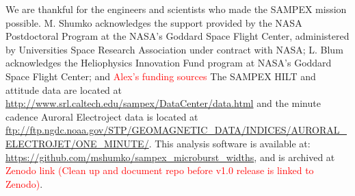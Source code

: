\documentclass[draft]{agujournal2019}
\begin{document}
%
%
%
%

\acknowledgments
We are thankful for the engineers and scientists who made the SAMPEX mission possible. M. Shumko acknowledges the support provided by the NASA Postdoctoral Program at the NASA’s Goddard Space Flight Center, administered by Universities Space Research Association under contract with NASA; L. Blum acknowledges the Heliophysics Innovation Fund program at NASA’s Goddard Space Flight Center; and \textcolor{red}{Alex's funding sources} The SAMPEX HILT and attitude data are located at \url{http://www.srl.caltech.edu/sampex/DataCenter/data.html} and the minute cadence Auroral Electroject data is located at \url{ftp://ftp.ngdc.noaa.gov/STP/GEOMAGNETIC_DATA/INDICES/AURORAL_ELECTROJET/ONE_MINUTE/}.
This analysis software is available at: \url{https://github.com/mshumko/sampex_microburst_widths}, and is archived at \textcolor{red}{Zenodo link (Clean up and document repo before v1.0 release is linked to Zenodo)}. 



%
%





%
%
%
%
%
\end{document}
